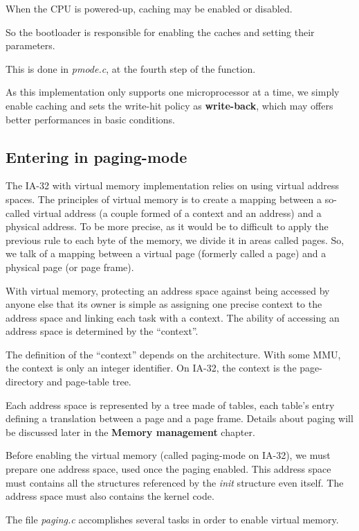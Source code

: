 When the CPU is powered-up, caching may be enabled or disabled.

So the bootloader is responsible for enabling the caches and setting
their parameters.

This is done in \textit{pmode.c}, at the fourth step of the function.

As this implementation only supports one microprocessor at a time, we
simply enable caching and sets the write-hit policy as
\textbf{write-back}, which may offers better performances in basic
conditions.

%
%

\subsection{Entering in paging-mode}

The IA-32 with virtual memory implementation relies on using virtual
address spaces. The principles of virtual memory is to create a
mapping between a so-called virtual address (a couple formed of a
context and an address) and a physical address. To be more precise, as
it would be to difficult to apply the previous rule to each byte of
the memory, we divide it in areas called pages. So, we talk of a
mapping between a virtual page (formerly called a page) and a physical
page (or page frame).

With virtual memory, protecting an address space against being
accessed by anyone else that its owner is simple as assigning one
precise context to the address space and linking each task with a
context. The ability of accessing an address space is determined by
the ``context''.

The definition of the ``context'' depends on the architecture. With
some MMU, the context is only an integer identifier. On IA-32, the
context is the page-directory and page-table tree.

Each address space is represented by a tree made of tables, each
table's entry defining a translation between a page and a page
frame. Details about paging will be discussed later in the
\textbf{Memory management} chapter.

Before enabling the virtual memory (called paging-mode on IA-32), we
must prepare one address space, used once the paging enabled. This
address space must contains all the structures referenced by the
\textit{init} structure even itself. The address space must also
contains the kernel code.

The file \textit{paging.c} accomplishes several tasks in order to
enable virtual memory.

